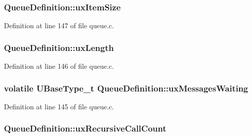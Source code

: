 \subsubsection[{\texorpdfstring{ux\+Item\+Size}{uxItemSize}}]{ Queue\+Definition\+::ux\+Item\+Size}\hypertarget{struct_queue_definition_a81bb7d3826909244baa9debf5a55abb0}{}\label{struct_queue_definition_a81bb7d3826909244baa9debf5a55abb0}


Definition at line 147 of file queue.\+c.

\subsubsection[{\texorpdfstring{ux\+Length}{uxLength}}]{ Queue\+Definition\+::ux\+Length}\hypertarget{struct_queue_definition_ae80d17a812c669d4d41265b7f693988c}{}\label{struct_queue_definition_ae80d17a812c669d4d41265b7f693988c}


Definition at line 146 of file queue.\+c.

\subsubsection[{\texorpdfstring{ux\+Messages\+Waiting}{uxMessagesWaiting}}]{\setlength{\rightskip}{0pt plus 5cm}volatile {\bf U\+Base\+Type\+\_\+t} Queue\+Definition\+::ux\+Messages\+Waiting}\hypertarget{struct_queue_definition_a12b07a40152d0f21488ca06d362d13d1}{}\label{struct_queue_definition_a12b07a40152d0f21488ca06d362d13d1}


Definition at line 145 of file queue.\+c.

\subsubsection[{\texorpdfstring{ux\+Recursive\+Call\+Count}{uxRecursiveCallCount}}]{ Queue\+Definition\+::ux\+Recursive\+Call\+Count}\hypertarget{struct_queue_definition_a2cf88e286477f6f89fe1009d722dc4cf}{}\label{struct_queue_definition_a2cf88e286477f6f89fe1009d722dc4cf}


